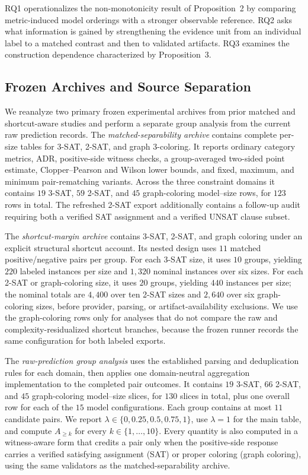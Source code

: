 \documentclass[acmsmall,screen,review,anonymous]{acmart}
\newcounter{experiment}
\begin{document}
RQ1 operationalizes the non-monotonicity result of Proposition~2 by comparing
metric-induced model orderings with a stronger observable reference. RQ2 asks
what information is gained by strengthening the evidence unit from an
individual label to a matched contrast and then to validated artifacts. RQ3
examines the construction dependence characterized by Proposition~3.

\subsection{Frozen Archives and Source Separation}
\label{sec:experimental-archives}

We reanalyze two primary frozen experimental archives from prior matched and
shortcut-aware studies and perform a separate group analysis from the current
raw prediction records.
The \emph{matched-separability archive} contains complete per-size
tables for 3-SAT, 2-SAT, and graph 3-coloring. It reports ordinary category
metrics, ADR, positive-side witness checks, a group-averaged two-sided point
estimate, Clopper--Pearson and Wilson lower bounds, and fixed, maximum, and
minimum pair-rematching variants. Across the three constraint domains it
contains \(19\) 3-SAT, \(59\) 2-SAT, and \(45\) graph-coloring model--size
rows, for \(123\) rows in total. The refreshed 2-SAT export additionally
contains a follow-up audit requiring both a verified SAT assignment and a
verified UNSAT clause subset.

The \emph{shortcut-margin archive} contains 3-SAT, 2-SAT, and graph coloring
under an explicit structural shortcut account. Its nested design uses \(11\)
matched positive/negative pairs per group. For each 3-SAT size, it uses \(10\)
groups, yielding \(220\) labeled instances per size and \(1{,}320\) nominal
instances over six sizes. For each 2-SAT or graph-coloring size, it uses
\(20\) groups, yielding \(440\) instances per size; the nominal totals are
\(4{,}400\) over ten 2-SAT sizes and \(2{,}640\) over six graph-coloring
sizes, before provider, parsing, or artifact-availability exclusions. We use
the graph-coloring rows only for analyses that do not compare the raw and
complexity-residualized shortcut branches, because the frozen runner records
the same configuration for both labeled exports.

The \emph{raw-prediction group analysis} uses the established parsing and
deduplication rules for each domain, then applies one domain-neutral
aggregation implementation to the completed pair outcomes. It contains
\(19\) 3-SAT, \(66\) 2-SAT, and \(45\) graph-coloring model--size slices,
for \(130\) slices in total, plus one overall row for each of the \(15\)
model configurations. Each group contains at most \(11\) candidate pairs. We
report \(\lambda\in\{0,0.25,0.5,0.75,1\}\), use \(\lambda=1\) for the
main table, and compute \(A_{\ge k}\) for every \(k\in\{1,\ldots,10\}\).
Every quantity is also computed in a witness-aware form that credits a pair
only when the positive-side response carries a verified satisfying assignment
(SAT) or proper coloring (graph coloring), using the same validators as the
matched-separability archive.
\end{document}
